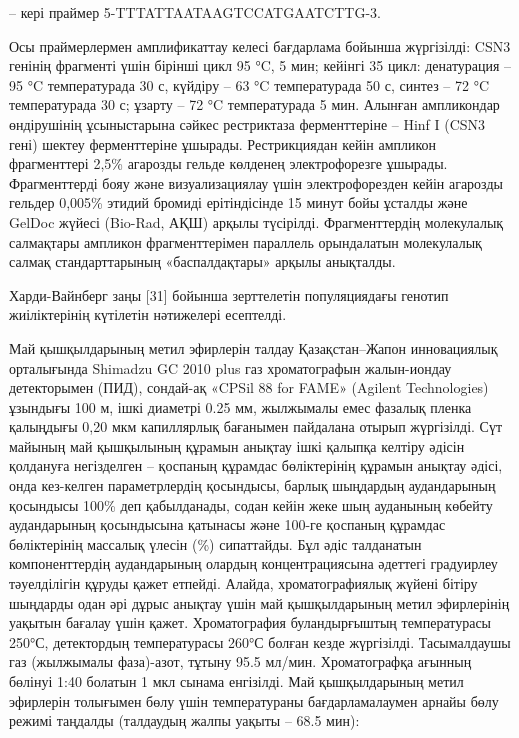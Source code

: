-- кері праймер 5\textquotesingle-TTTATTAATAAGTCCATGAATCTTG-3.
\begin{multicols}{2}


Осы праймерлермен амплификаттау келесі бағдарлама бойынша жүргізілді:
CSN3 генінің фрагменті үшін бірінші цикл 95 °C, 5 мин; кейінгі 35 цикл:
денатурация -- 95 °C температурада 30 с, күйдіру -- 63 °C температурада
50 с, синтез -- 72 °C температурада 30 с; ұзарту -- 72 °C температурада
5 мин. Алынған ампликондар өндірушінің ұсыныстарына сәйкес рестриктаза
ферменттеріне -- Hinf I (CSN3 гені) шектеу ферменттеріне ұшырады.
Рестрикциядан кейін ампликон фрагменттері 2,5\% агарозды гельде көлденең
электрофорезге ұшырады. Фрагменттерді бояу және визуализациялау үшін
электрофорезден кейін агарозды гельдер 0,005\% этидий бромиді
ерітіндісінде 15 минут бойы ұсталды және GelDoc жүйесі (Bio-Rad, АҚШ)
арқылы түсірілді. Фрагменттердің молекулалық салмақтары ампликон
фрагменттерімен параллель орындалатын молекулалық салмақ стандарттарының
«баспалдақтары» арқылы анықталды.

Харди-Вайнберг заңы {[}31{]} бойынша зерттелетін популяциядағы генотип
жиіліктерінің күтілетін нәтижелері есептелді.

Май қышқылдарының метил эфирлерін талдау Қазақстан--Жапон инновациялық
орталығында Shimadzu GC 2010 plus газ хроматографын жалын-иондау
детекторымен (ПИД), сондай-ақ «CPSil 88 for FAME» (Agilent Technologies)
ұзындығы 100 м, ішкі диаметрі 0.25 мм, жылжымалы емес фазалық пленка
қалыңдығы 0,20 мкм капиллярлық бағанымен пайдалана отырып жүргізілді.
Сүт майының май қышқылының құрамын анықтау ішкі қалыпқа келтіру әдісін
қолдануға негізделген -- қоспаның құрамдас бөліктерінің құрамын анықтау
әдісі, онда кез-келген параметрлердің қосындысы, барлық шыңдардың
аудандарының қосындысы 100\% деп қабылданады, содан кейін жеке шың
ауданының көбейту аудандарының қосындысына қатынасы және 100-ге қоспаның
құрамдас бөліктерінің массалық үлесін (\%) сипаттайды. Бұл әдіс
талданатын компоненттердің аудандарының олардың концентрациясына
әдеттегі градуирлеу тәуелділігін құруды қажет етпейді. Алайда,
хроматографиялық жүйені бітіру шыңдарды одан әрі дұрыс анықтау үшін май
қышқылдарының метил эфирлерінің уақытын бағалау үшін қажет.
Хроматография буландырғыштың температурасы 250°С, детектордың
температурасы 260°С болған кезде жүргізілді. Тасымалдаушы газ (жылжымалы
фаза)-азот, тұтыну 95.5 мл/мин. Хроматографқа ағынның бөлінуі 1:40
болатын 1 мкл сынама енгізілді. Май қышқылдарының метил эфирлерін
толығымен бөлу үшін температураны бағдарламалаумен арнайы бөлу режимі
таңдалды (талдаудың жалпы уақыты -- 68.5 мин):


\end{multicols}
